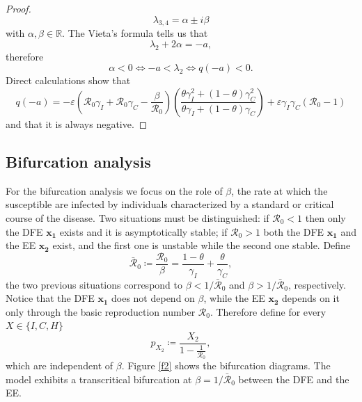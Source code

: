 \documentclass[11pt,reqno]{amsart}
\theoremstyle{boldremark}
\begin{document}
\begin{proof}
    \begin{equation*}
        \lambda_{3,4}=\alpha \pm i \beta 
    \end{equation*} 
    with $\alpha, \beta \in \mathbb{R}$. The Vieta's formula tells us that 
    \begin{equation*}
        \lambda_2 + 2 \alpha = -a, 
    \end{equation*}
    therefore 
    \begin{equation*}
        \alpha < 0 \Longleftrightarrow -a < \lambda_2 \Longleftrightarrow q(-a) < 0. 
    \end{equation*}
    Direct calculations show that 
    \begin{equation*}
        q(-a) = -\varepsilon \left(\mathcal{R}_0 \gamma_I + \mathcal{R}_0 \gamma_C -\frac{\beta}{\mathcal{R}_0}\right) \left(\frac{\theta \gamma_I^2 + (1-\theta)\gamma_C^2}{\theta \gamma_I + (1-\theta)\gamma_C}\right) + \varepsilon \gamma_I \gamma_C (\mathcal{R}_0-1) 
    \end{equation*}
    and that it is always negative. 
\end{proof}

\subsection{Bifurcation analysis}

\noindent For the bifurcation analysis we focus on the role of $\beta$, the rate at which the susceptible are infected by individuals characterized by a standard or critical course of the disease. Two situations must be distinguished: if $\mathcal{R}_0<1$ then only the DFE $\mathbf{x_1}$ exists and it is asymptotically stable; if $\mathcal{R}_0>1$ both the DFE $\mathbf{x_1}$ and the EE $\mathbf{x_2}$ exist, and the first one is unstable while the second one stable. Define 
\begin{equation*}
    \bar{\mathcal{R}}_0 \coloneqq \frac{\mathcal{R}_0}{\beta}=\frac{1-\theta}{\gamma_I}+\frac{\theta}{\gamma_C}, 
\end{equation*}
the two previous situations correspond to $\beta<1/\bar{\mathcal{R}}_0$ and $\beta>1/\bar{\mathcal{R}}_0$, respectively. Notice that the DFE $\mathbf{x_1}$ does not depend on $\beta$, while the EE $\mathbf{x_2}$ depends on it only through the basic reproduction number $\mathcal{R}_0$. Therefore define for every $X \in \{I,C,H\}$ 
\begin{equation*}
    p_{X_2} \coloneqq \frac{X_2}{1-\frac{1}{\mathcal{R}_0}},  
\end{equation*} 
which are independent of $\beta$. Figure \ref{f2} shows the bifurcation diagrams. The model exhibits a transcritical bifurcation at $\beta=1/\bar{\mathcal{R}}_0$ between the DFE and the EE. 
\end{document}
